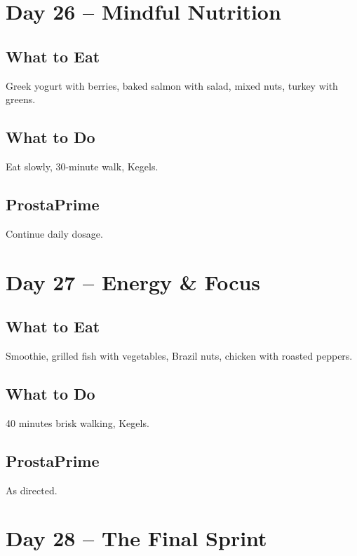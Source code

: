 \documentclass[11pt,oneside]{book}
\begin{document}
\clearpage


\chapter*{Day 26 – Mindful Nutrition}

\section*{What to Eat}
Greek yogurt with berries, baked salmon with salad, mixed nuts, turkey with greens.

\section*{What to Do}
Eat slowly, 30-minute walk, Kegels.

\section*{ProstaPrime}
Continue daily dosage.

\clearpage


\chapter*{Day 27 – Energy \& Focus}

\section*{What to Eat}
Smoothie, grilled fish with vegetables, Brazil nuts, chicken with roasted peppers.

\section*{What to Do}
40 minutes brisk walking, Kegels.

\section*{ProstaPrime}
As directed.

\clearpage


\chapter*{Day 28 – The Final Sprint}
\end{document}
